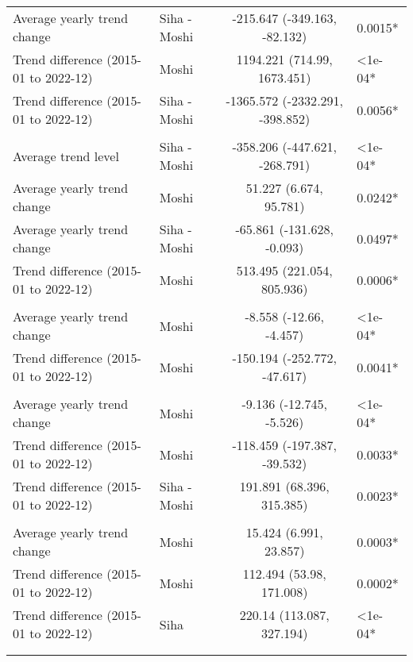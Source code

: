 \begin{longtable}{l|lcl}
Average yearly trend change & Siha - Moshi & -215.647 (-349.163, -82.132) & 0.0015* \\ 
Trend difference (2015-01 to 2022-12) & Moshi & 1194.221 (714.99, 1673.451) & <1e-04* \\ 
Trend difference (2015-01 to 2022-12) & Siha - Moshi & -1365.572 (-2332.291, -398.852) & 0.0056* \\ 
\midrule\addlinespace[2.5pt]
\multicolumn{4}{l}{Urinary Tract Infections} \\[2.5pt] 
\midrule\addlinespace[2.5pt]
Average trend level & Siha - Moshi & -358.206 (-447.621, -268.791) & <1e-04* \\ 
Average yearly trend change & Moshi & 51.227 (6.674, 95.781) & 0.0242* \\ 
Average yearly trend change & Siha - Moshi & -65.861 (-131.628, -0.093) & 0.0497* \\ 
Trend difference (2015-01 to 2022-12) & Moshi & 513.495 (221.054, 805.936) & 0.0006* \\ 
\midrule\addlinespace[2.5pt]
\multicolumn{4}{l}{Caries} \\[2.5pt] 
\midrule\addlinespace[2.5pt]
Average yearly trend change & Moshi & -8.558 (-12.66, -4.457) & <1e-04* \\ 
Trend difference (2015-01 to 2022-12) & Moshi & -150.194 (-252.772, -47.617) & 0.0041* \\ 
\midrule\addlinespace[2.5pt]
\multicolumn{4}{l}{Dysentery} \\[2.5pt] 
\midrule\addlinespace[2.5pt]
Average yearly trend change & Moshi & -9.136 (-12.745, -5.526) & <1e-04* \\ 
Trend difference (2015-01 to 2022-12) & Moshi & -118.459 (-197.387, -39.532) & 0.0033* \\ 
Trend difference (2015-01 to 2022-12) & Siha - Moshi & 191.891 (68.396, 315.385) & 0.0023* \\ 
\midrule\addlinespace[2.5pt]
\multicolumn{4}{l}{Peptic Ulcers} \\[2.5pt] 
\midrule\addlinespace[2.5pt]
Average yearly trend change & Moshi & 15.424 (6.991, 23.857) & 0.0003* \\ 
Trend difference (2015-01 to 2022-12) & Moshi & 112.494 (53.98, 171.008) & 0.0002* \\ 
Trend difference (2015-01 to 2022-12) & Siha & 220.14 (113.087, 327.194) & <1e-04* \\ 
\midrule\addlinespace[2.5pt]
\multicolumn{4}{l}{Malnutrition} \\[2.5pt] 
\midrule\addlinespace[2.5pt]

\end{longtable}
